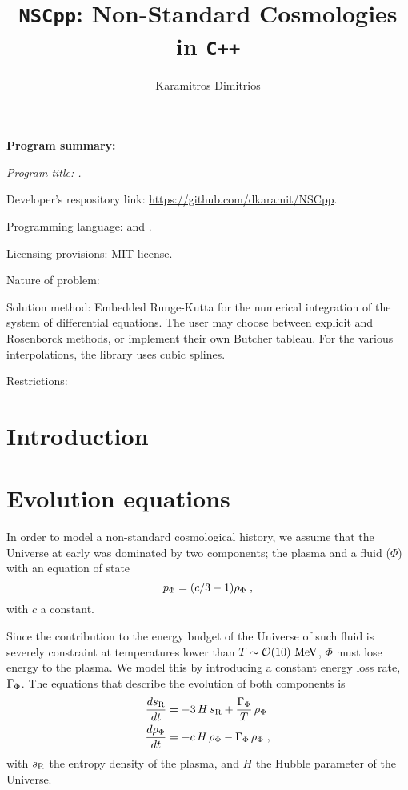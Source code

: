 \documentclass[11pt,a4paper]{article}
\author[ ]{Karamitros Dimitrios}
\affil[ ]{\em School of Physics and Astronomy, The University of Manchester,
	Manchester M13 9PL, United Kingdom}
\affil[ ]{\textit{E-mail: } \href{mailto:dimitrios.karamitros@manchester.ac.uk}{\color{blue}{dimitrios.karamitros@manchester.ac.uk}}}
\title{{\tt NSCpp}: Non-Standard Cosmologies in {\tt C++}}
\begin{document}
\maketitle


\begin{abstract}
\end{abstract}

{\bf Program summary:}

{\sl 
	Program title: \nsc.
	
	Developer's respository link: \href{https://github.com/dkaramit/NSCpp}{https://github.com/dkaramit/NSCpp}.
	
	Programming language: \CPP and \PY.
	
	Licensing provisions: MIT license.
	
	Nature of problem: 
	
	Solution method: Embedded Runge-Kutta for the numerical integration of the system of differential equations. The user may choose between explicit and Rosenborck methods, or implement their own Butcher tableau. For the various interpolations, the library uses cubic splines. 
	
	Restrictions: 
}

\tableofcontents




\section{Introduction}\label{sec:intro}
\setcounter{equation}{0}

\section{Evolution equations}\label{sec:equations}
\setcounter{equation}{0}

In order to model a non-standard cosmological history, we assume that the Universe at early was dominated by two components; the plasma and a fluid ($\Phi$) with an equation of state
%
\begin{equation}
	p_{\Phi} = (c/3-1) \rho_{\Phi} \;,
	\label{eq:EOS}
\end{equation}  
%
with $c$ a constant. 

Since the contribution to the energy budget of the Universe of such fluid is severely constraint at temperatures lower than $T \sim \mathcal{O}(10)~{\rm MeV}$, $\Phi$ must lose energy to the plasma. We model this by introducing a constant energy loss rate, $\Gamma_{\Phi}$. The equations that describe the evolution of both components is
%
\begin{align}
	\dfrac{ds_{\rm R}}{dt} &= -3 \, H  \, s_{\rm R} + \dfrac{\Gamma_{\Phi}}{T} \, \rho_{\Phi} \label{eq:dsdt} \\ 
	\dfrac{d\rho_{\Phi}}{dt} &= - c \, H \, \rho_{\Phi} - \Gamma_{\Phi} \, \rho_{\Phi} \label{eq:drhoPhidt } \;,
\end{align}
%
with $s_{\rm R}$ the entropy density of the plasma, and $H$ the Hubble parameter of the Universe. 
\end{document}
